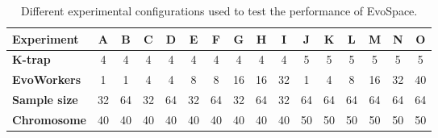 \begin{table}[t]
\caption{Different experimental configurations used to test the
  performance of EvoSpace.} %
\centering
\scriptsize
\begin{tabular}{|l||c|c|c|c|c|c|c|c|c|c|c|c|c|c|c|}
   \hline
             \textbf{Experiment} 	& A & B & C & D & E & F & G & H & I & J & K & L & M & N & O \\

   \hline
               \textbf{K-trap}   	& 4  & 4  & 4  & 4  & 4  & 4  & 4  & 4  & 4 & 5 & 5 & 5 & 5 & 5 & 5 \\
			   \textbf{EvoWorkers}  & 1  & 1  & 4  & 4  & 8  & 8  & 16 & 16 & 32 & 1 & 4 & 8 & 16 & 32 & 40 \\
			   \textbf{Sample size} & 32 & 64 & 32 & 64 & 32 & 64 & 32 & 64 & 32 & 64 & 64 & 64 & 64 & 64 & 64 \\
			   \textbf{Chromosome} & 40 & 40 & 40 & 40 & 40 & 40 & 40 & 40 & 40 & 50 & 50 & 50 & 50 & 50 & 50 \\
   \hline
\end{tabular}
\label{tab:exp}
\end{table}


%
%


%
%

